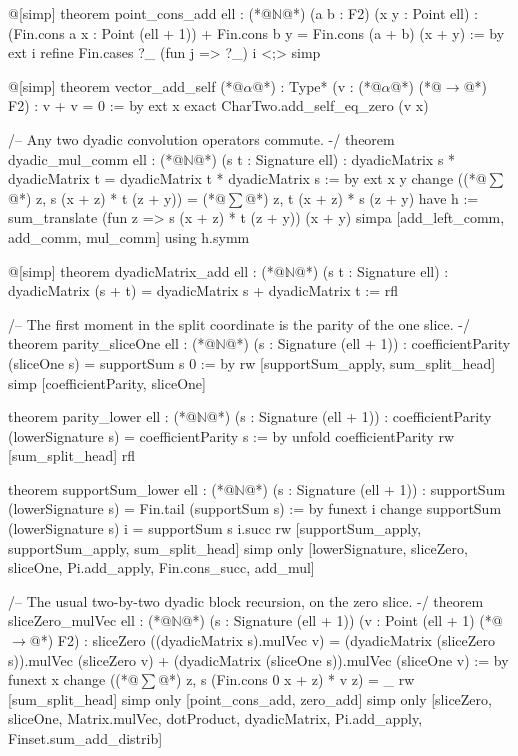 @[simp] theorem point_cons_add {ell : (*@$\mathbb{N}$@*)} (a b : F2) (x y : Point ell) :
    (Fin.cons a x : Point (ell + 1)) + Fin.cons b y = Fin.cons (a + b) (x + y) := by
  ext i
  refine Fin.cases ?_ (fun j => ?_) i <;> simp

@[simp] theorem vector_add_self {(*@$\alpha$@*) : Type*} (v : (*@$\alpha$@*) (*@$\to$@*) F2) : v + v = 0 := by
  ext x
  exact CharTwo.add_self_eq_zero (v x)

/-- Any two dyadic convolution operators commute. -/
theorem dyadic_mul_comm {ell : (*@$\mathbb{N}$@*)} (s t : Signature ell) :
    dyadicMatrix s * dyadicMatrix t = dyadicMatrix t * dyadicMatrix s := by
  ext x y
  change ((*@$\sum$@*) z, s (x + z) * t (z + y)) = (*@$\sum$@*) z, t (x + z) * s (z + y)
  have h := sum_translate (fun z => s (x + z) * t (z + y)) (x + y)
  simpa [add_left_comm, add_comm, mul_comm] using h.symm

@[simp] theorem dyadicMatrix_add {ell : (*@$\mathbb{N}$@*)} (s t : Signature ell) :
    dyadicMatrix (s + t) = dyadicMatrix s + dyadicMatrix t := rfl

/-- The first moment in the split coordinate is the parity of the one slice. -/
theorem parity_sliceOne {ell : (*@$\mathbb{N}$@*)} (s : Signature (ell + 1)) :
    coefficientParity (sliceOne s) = supportSum s 0 := by
  rw [supportSum_apply, sum_split_head]
  simp [coefficientParity, sliceOne]

theorem parity_lower {ell : (*@$\mathbb{N}$@*)} (s : Signature (ell + 1)) :
    coefficientParity (lowerSignature s) = coefficientParity s := by
  unfold coefficientParity
  rw [sum_split_head]
  rfl

theorem supportSum_lower {ell : (*@$\mathbb{N}$@*)} (s : Signature (ell + 1)) :
    supportSum (lowerSignature s) = Fin.tail (supportSum s) := by
  funext i
  change supportSum (lowerSignature s) i = supportSum s i.succ
  rw [supportSum_apply, supportSum_apply, sum_split_head]
  simp only [lowerSignature, sliceZero, sliceOne, Pi.add_apply, Fin.cons_succ, add_mul]

/-- The usual two-by-two dyadic block recursion, on the zero slice. -/
theorem sliceZero_mulVec {ell : (*@$\mathbb{N}$@*)} (s : Signature (ell + 1)) (v : Point (ell + 1) (*@$\to$@*) F2) :
    sliceZero ((dyadicMatrix s).mulVec v) =
      (dyadicMatrix (sliceZero s)).mulVec (sliceZero v) +
      (dyadicMatrix (sliceOne s)).mulVec (sliceOne v) := by
  funext x
  change ((*@$\sum$@*) z, s (Fin.cons 0 x + z) * v z) = _
  rw [sum_split_head]
  simp only [point_cons_add, zero_add]
  simp only [sliceZero, sliceOne, Matrix.mulVec, dotProduct, dyadicMatrix,
    Pi.add_apply, Finset.sum_add_distrib]


